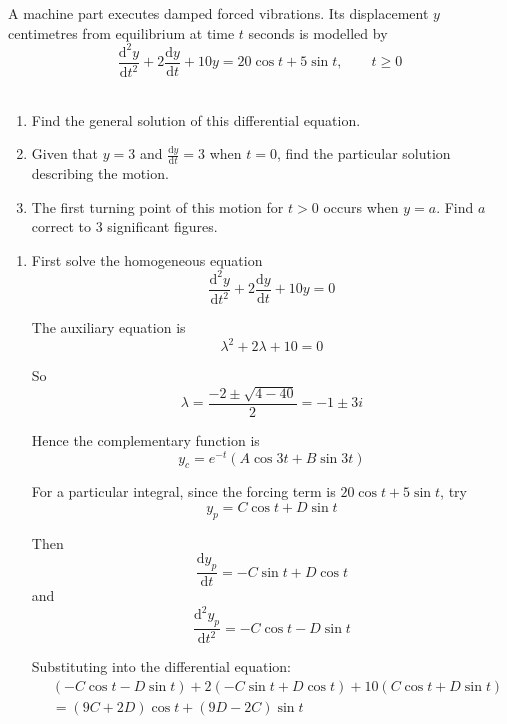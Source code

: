 \documentclass[leqno]{article}
\begin{document}
\begin{enumerate}[
  label=\textbf{\arabic*.},
  leftmargin=*,
  topsep=0pt,
  partopsep=0pt,
  parsep=0pt
]
A machine part executes damped forced vibrations. Its displacement $y$ centimetres from equilibrium at time $t$ seconds is modelled by \\
\[
\frac{\mathrm{d}^2 y}{\mathrm{d}t^2}+2\frac{\mathrm{d}y}{\mathrm{d}t}+10y=20\cos t+5\sin t,\qquad t\ge 0
\] \\
\begin{enumerate}[label=\textbf{(\alph*)}]
  \item Find the general solution of this differential equation.  \\
  \item Given that $y=3$ and $\frac{\mathrm{d}y}{\mathrm{d}t}=3$ when $t=0$, find the particular solution describing the motion.  \\
  \item The first turning point of this motion for $t>0$ occurs when $y=a$. Find $a$ correct to $3$ significant figures.  \\
\end{enumerate}

\vspace*{30pt}

\begin{tcolorbox}[colback=white, colframe=scarlet, title={\textbf{Solution}}, breakable, grow to left by=6mm, grow to right by=10mm]
\begin{enumerate}[label=\textbf{(\alph*)}]
  \item First solve the homogeneous equation
\[
\frac{\mathrm{d}^2y}{\mathrm{d}t^2}+2\frac{\mathrm{d}y}{\mathrm{d}t}+10y=0
\]

The auxiliary equation is
\[
\lambda^2+2\lambda+10=0
\]

So
\[
\lambda=\frac{-2\pm\sqrt{4-40}}{2}=-1\pm 3i
\]

Hence the complementary function is
\[
y_c=e^{-t}(A\cos 3t+B\sin 3t)
\]

For a particular integral, since the forcing term is \(20\cos t+5\sin t\), try
\[
y_p=C\cos t+D\sin t
\]

Then
\[
\frac{\mathrm{d}y_p}{\mathrm{d}t}=-C\sin t+D\cos t
\]
and
\[
\frac{\mathrm{d}^2y_p}{\mathrm{d}t^2}=-C\cos t-D\sin t
\]

Substituting into the differential equation:
\begin{align*}
&(-C\cos t-D\sin t)+2(-C\sin t+D\cos t)+10(C\cos t+D\sin t)\\
&=(9C+2D)\cos t+(9D-2C)\sin t
\end{align*}


\end{enumerate}
\end{tcolorbox}
\end{enumerate}
\end{document}

